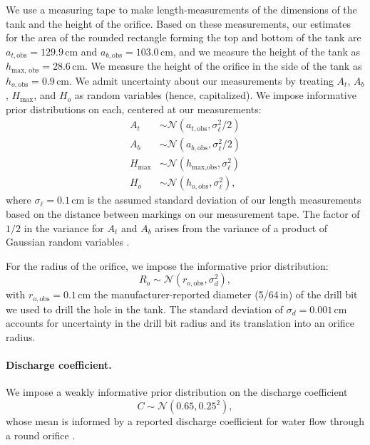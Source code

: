 \documentclass[openacc]{rsproca_new}%
\begin{document}
We use a measuring tape to make length-measurements of the dimensions of the tank and the height of the orifice. 
Based on these measurements, our estimates for the area of the rounded rectangle forming the top and bottom of the tank are $a_{t, \text{obs}}=129.9$\,cm and $a_{b, \text{obs}}=103.0$\,cm, and we measure the height of the tank as $h_{\text{max, obs}}=28.6$\,cm. 
We measure the height of the orifice in the side of the tank as $h_{o, \text{obs}}=0.9$\,cm. 
We admit uncertainty about our measurements by treating $A_t$, $A_b$, $H_{\text{max}}$, and $H_o$ as random variables (hence, capitalized). We impose informative prior distributions on each, centered at our measurements:
\begin{align}
A_t &\sim \mathcal{N}(a_{t, \text{obs}}, \sigma_\ell^2/2) \label{eq:A_t_prior} \\
A_b &\sim \mathcal{N}(a_{b, \text{obs}}, \sigma_\ell^2/2) \\
H_{\text{max}} &\sim \mathcal{N}(h_{\text{max}, \text{obs}}, \sigma_\ell^2) \\
H_o &\sim \mathcal{N}(h_{o, \text{obs}}, \sigma_\ell^2),
\end{align}
where $\sigma_\ell=0.1$\,cm is the assumed standard deviation of our length measurements based on the distance between markings on our measurement tape. The factor of $1/2$ in the variance for $A_t$ and $A_b$ arises from the variance of a product of Gaussian random variables \cite{bromiley2003products}.

For the radius of the orifice, we impose the informative prior distribution:
\begin{equation}
R_o \sim \mathcal{N}(r_{o, \text{obs}}, \sigma_d^2), \label{eq:R_o_prior}
\end{equation}
with $r_{o, \text{obs}}=0.1$\,cm the manufacturer-reported diameter (5/64\,in) of the drill bit we used to drill the hole in the tank. The standard deviation of $\sigma_d= 0.001$\,cm accounts for uncertainty in the drill bit radius and its translation into an orifice radius.

\vspace{-\baselineskip}
\paragraph{Discharge coefficient.} 
We impose a weakly informative prior distribution on the discharge coefficient
\begin{equation}
	C \sim \mathcal{N}(0.65, 0.25^2),
\end{equation} whose mean is informed by a reported discharge coefficient for water flow through a round orifice \cite{hicks2014determining}. 
\end{document}

